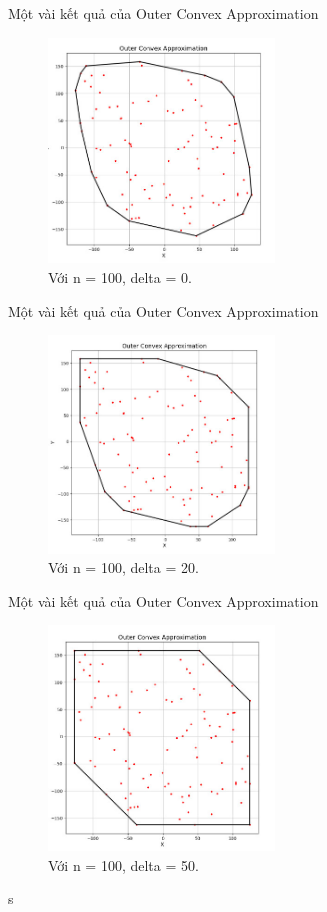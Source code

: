 \documentclass[11pt]{beamer}
\theoremstyle{definition}
\theoremstyle{plain}
\theoremstyle{plain}
\theoremstyle{remark}
\begin{document}
	\begin{frame}{Một vài kết quả của Outer Convex Approximation}
		\begin{figure}
			\begin{center}
				\includegraphics[width=6cm]{./result_outer_cv_delta0.jpg}
				\caption{Với n = 100, delta = 0.}
				\label{result_outer_cv_delta0}
			\end{center}
		\end{figure}
		
	\end{frame}
	\begin{frame}{Một vài kết quả của Outer Convex Approximation}
		\begin{figure}
			\begin{center}
				\includegraphics[width=6cm]{./result_outer_cv_delta20.jpg}
				\caption{Với n = 100, delta = 20.}
				\label{result_outer_cv_delta20}
			\end{center}
		\end{figure}
		
	\end{frame}
	\begin{frame}{Một vài kết quả của Outer Convex Approximation}
		\begin{figure}
			\begin{center}
				\includegraphics[width=6cm]{./result_outer_cv_delta50.jpg}
				\caption{Với n = 100, delta = 50.}
				\label{result_outer_cv_delta50}
			\end{center}
		\end{figure}
		s
	\end{frame}
\end{document}

